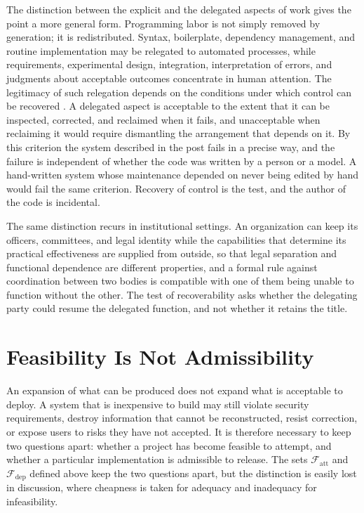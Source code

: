 \documentclass[11pt]{article}
\theoremstyle{remark}
\newcommand{\F}{\mathcal{F}}
\begin{document}
The distinction between the explicit and the delegated aspects of work gives the point a more general form. Programming labor is not simply removed by generation; it is redistributed. Syntax, boilerplate, dependency management, and routine implementation may be relegated to automated processes, while requirements, experimental design, integration, interpretation of errors, and judgments about acceptable outcomes concentrate in human attention. The legitimacy of such relegation depends on the conditions under which control can be recovered \cite{flyxion_aspect}. A delegated aspect is acceptable to the extent that it can be inspected, corrected, and reclaimed when it fails, and unacceptable when reclaiming it would require dismantling the arrangement that depends on it. By this criterion the system described in the post fails in a precise way, and the failure is independent of whether the code was written by a person or a model. A hand-written system whose maintenance depended on never being edited by hand would fail the same criterion. Recovery of control is the test, and the author of the code is incidental.

The same distinction recurs in institutional settings. An organization can keep its officers, committees, and legal identity while the capabilities that determine its practical effectiveness are supplied from outside, so that legal separation and functional dependence are different properties, and a formal rule against coordination between two bodies is compatible with one of them being unable to function without the other. The test of recoverability asks whether the delegating party could resume the delegated function, and not whether it retains the title.

\section{Feasibility Is Not Admissibility}

An expansion of what can be produced does not expand what is acceptable to deploy. A system that is inexpensive to build may still violate security requirements, destroy information that cannot be reconstructed, resist correction, or expose users to risks they have not accepted. It is therefore necessary to keep two questions apart: whether a project has become feasible to attempt, and whether a particular implementation is admissible to release. The sets $\F_{\mathrm{att}}$ and $\F_{\mathrm{dep}}$ defined above keep the two questions apart, but the distinction is easily lost in discussion, where cheapness is taken for adequacy and inadequacy for infeasibility.
\end{document}
